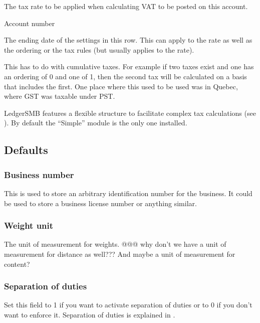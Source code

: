 \begin{description}[style=nextline]
\item [Rate (\%)] The tax rate to be applied when calculating VAT to be posted on this account.
\item [Number] Account number
\item [Valid To] The ending date of the settings in this row. This can apply to the rate as well as the ordering or the tax rules (but usually applies to the rate).
\item [Ordering] This has to do with cumulative taxes.  For example if two taxes
exist and one has an ordering of 0 and one of 1, then the second tax will be
calculated on a basis that includes the first.  One place where this used to be
used was in Quebec, where GST was taxable under PST.
\item [Tax rules] LedgerSMB features a flexible structure to facilitate complex tax
calculations (see ). By default the ``Simple'' module
is the only one installed.
\end{description}

\subsection{Defaults}
\label{subsec-company-config-defaults}

\subsubsection{Business number}
\label{subsubsec-company-config-defaults-business-number}
   This is used to store an arbitrary identification number for the business.  It
could be used to store a business license number or anything similar.
   
\subsubsection{Weight unit}
\label{subsubsec-company-config-defaults-weight-unit}
   The unit of measurement for weights. @@@ why don't we have a unit of measurement for distance as well??? And maybe a unit of measurement for content?
   
\subsubsection{Separation of duties}
\label{subsubsec-company-config-defaults-separation-of-duties}

Set this field to 1 if you want to activate separation of duties or to 0 if you don't
want to enforce it. Separation of duties is explained in .

